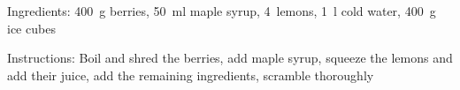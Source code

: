 Ingredients:
400~g berries, 50~ml maple syrup, 4~lemons, 1~l cold water, 400~g ice cubes

\noindent Instructions: Boil and shred the berries, add maple syrup, squeeze the lemons and add their juice, add the remaining ingredients, scramble thoroughly